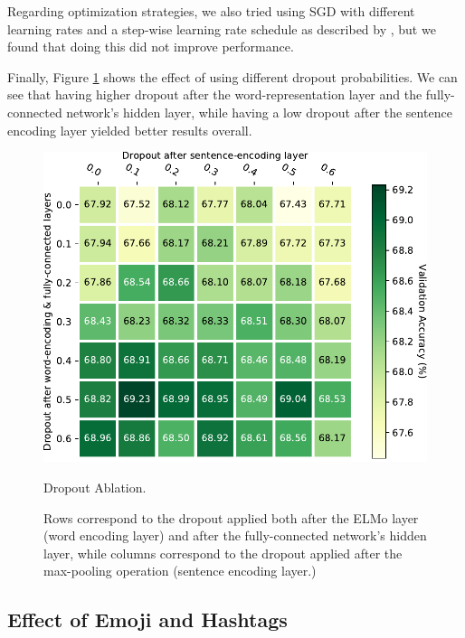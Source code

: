 \documentclass[11pt,a4paper]{article}
\begin{document}
Regarding optimization strategies, we also tried using SGD with different
learning rates and a step-wise learning rate schedule as described by
\citet{conneau2018}, but we found that doing this did not improve performance. 

Finally, Figure \ref{fig:dropouts} shows the effect of using different dropout
probabilities. We can see that having higher dropout after the
word-representation layer and the fully-connected network's hidden layer, while
having a low dropout after the sentence encoding layer yielded better results
overall. 

\begin{figure}[!h]
    \centering
    \includegraphics[width=\columnwidth]{images/dropout_table.pdf}

    \caption{Dropout Ablation. }
    \vspace{-0.4cm}

    \caption*{
        \footnotesize Rows correspond to the dropout applied both after
        the ELMo layer (word encoding layer) and after the fully-connected network's
        hidden layer, while columns correspond to the dropout applied after the
        max-pooling operation (sentence encoding layer.)}

\label{fig:dropouts}
\end{figure}

\subsection{Effect of Emoji and Hashtags}%
\label{sub:effect_of_emoji_and_hashtags}
\end{document}
